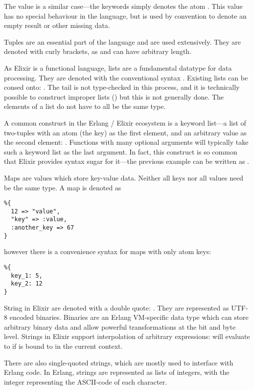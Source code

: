 The value  is a similar case---the keywords simply denotes the atom .
This value has no special behaviour in the language, but is used by convention to denote an empty result or other missing data.

Tuples are an essential part of the language and are used extensively.
They are denoted with curly brackets, as  and can have arbitrary length.

As Elixir is a functional language, lists are a fundamental datatype for data processing.
They are denoted with the conventional syntax \exs{[1, 2, 3]}.
Existing lists can be consed onto: \exs{[1, 2 | tail]}.
The tail is not type-checked in this process, and it is technically possible to construct improper lists (\exs{[1 | 2
]}) but this is not generally done.
The elements of a list do not have to all be the same type.

A common construct in the Erlang / Elixir ecosystem is a keyword list---a list of two-tuples with an atom (the key) as the first element, and an arbitrary value as the second element: .
Functions with many optional arguments will typically take such a keyword list as the last argument.
In fact, this construct is so common that Elixir provides syntax sugar for it---the previous example can be written as .

Maps are values which store key-value data.
Neither all keys nor all values need be the same type.
A map is denoted as
\begin{verbatim}
%{
  12 => "value",
  "key" => :value,
  :another_key => 67
}	
\end{verbatim}
however there is a convenience syntax for maps with only atom keys:
\begin{verbatim}
%{
  key_1: 5,
  key_2: 12
}	
\end{verbatim}

String in Elixir are denoted with a double quote: .
They are represented as UTF-8 encoded binaries.
Binaries are an Erlang VM-specific data type which can store arbitrary binary data and allow powerful transformations at the bit and byte level.
Strings in Elixir support interpolation of arbitrary expressions:  will evaluate to  if  is bound to  in the current context.

There are also single-quoted strings, which are mostly used to interface with Erlang code.
In Erlang, strings are represented as lists of integers, with the integer representing the ASCII-code of each character.

